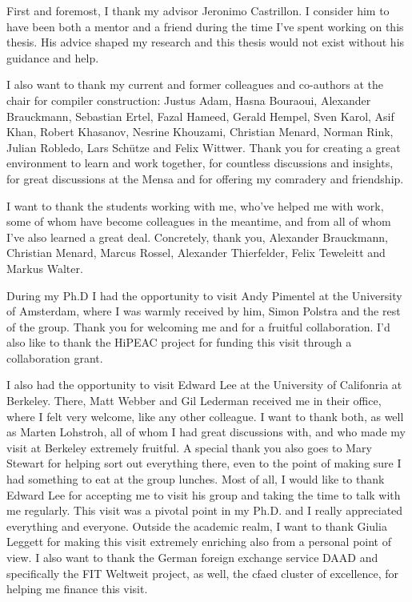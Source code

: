 First and foremost, I thank my advisor Jeronimo Castrillon.
I consider him to have been both a mentor and a friend during the time I've spent working on this thesis.
His advice shaped my research and this thesis would not exist without his guidance and help.

I also want to thank my current and former colleagues and co-authors at the chair for compiler construction:
Justus Adam, Hasna Bouraoui, Alexander Brauckmann, Sebastian Ertel, Fazal Hameed, Gerald Hempel, Sven Karol, Asif Khan, Robert Khasanov, Nesrine Khouzami, Christian Menard, Norman Rink, Julian Robledo, Lars Schütze and Felix Wittwer.
Thank you for creating a great environment to learn and work together, for countless discussions and insights, for great discussions at the Mensa and for offering my comradery and friendship. 

I want to thank the students working with me, who've helped me with work, some of whom have become colleagues in the meantime, and from all of whom I've also learned a great deal.
Concretely, thank you, Alexander Brauckmann, Christian Menard, Marcus Rossel, Alexander Thierfelder, Felix Teweleitt and Markus Walter.

During my Ph.D I had the opportunity to visit Andy Pimentel at the University of Amsterdam, where I was warmly received by him, Simon Polstra and the rest of the group.
Thank you for welcoming me and for a fruitful collaboration. I'd also like to thank the HiPEAC project for funding this visit through a collaboration grant.

I also had the opportunity to visit Edward Lee at the University of Califonria at Berkeley. There, Matt Webber and Gil Lederman received me in their office, where I felt very welcome, like any other colleague.
I want to thank both, as well as Marten Lohstroh, all of whom I had great discussions with, and who made my visit at Berkeley extremely fruitful.
A special thank you also goes to Mary Stewart for helping sort out everything there, even to the point of making sure I had something to eat at the group lunches. 
Most of all, I would like to thank Edward Lee for accepting me to visit his group and taking the time to talk with me regularly.
This visit was a pivotal point in my Ph.D. and I really appreciated everything and everyone.
Outside the academic realm, I want to thank Giulia Leggett for making this visit extremely enriching also from a personal point of view.
I also want to thank the German foreign exchange service DAAD and specifically the FIT Weltweit project, as well, the \ac{cfaed} cluster of excellence, for helping me finance this visit.

